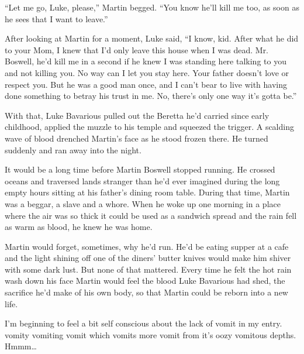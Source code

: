 ``Let me go, Luke, please,'' Martin begged. ``You know he'll kill me
too, as soon as he sees that I want to leave.''



After looking at Martin for a moment, Luke said, ``I know, kid.
After what he did to your Mom, I knew that I'd only leave this
house when I was dead. Mr. Boswell, he'd kill me in a second if he
knew I was standing here talking to you and not killing you. No way
can I let you stay here. Your father doesn't love or respect you.
But he was a good man once, and I can't bear to live with having
done something to betray his trust in me. No, there's only one way
it's gotta be.''



With that, Luke Bavarious pulled out the Beretta he'd carried since
early childhood, applied the muzzle to his temple and squeezed the
trigger. A scalding wave of blood drenched Martin's face as he
stood frozen there. He turned suddenly and ran away into the
night.



It would be a long time before Martin Boswell stopped running. He
crossed oceans and traversed lands stranger than he'd ever imagined
during the long empty hours sitting at his father's dining room
table. During that time, Martin was a beggar, a slave and a whore.
When he woke up one morning in a place where the air was so thick
it could be used as a sandwich spread and the rain fell as warm as
blood, he knew he was home.



Martin would forget, sometimes, why he'd run. He'd be eating supper
at a cafe and the light shining off one of the diners' butter
knives would make him shiver with some dark lust. But none of that
mattered. Every time he felt the hot rain wash down his face Martin
would feel the blood Luke Bavarious had shed, the sacrifice he'd
make of his own body, so that Martin could be reborn into a new
life. 
 





I'm beginning to feel a bit self conscious about the lack of vomit
in my entry.  vomity vomiting vomit which vomits more vomit
from it's oozy vomitous depths. Hmmm{\ldots} 

 





